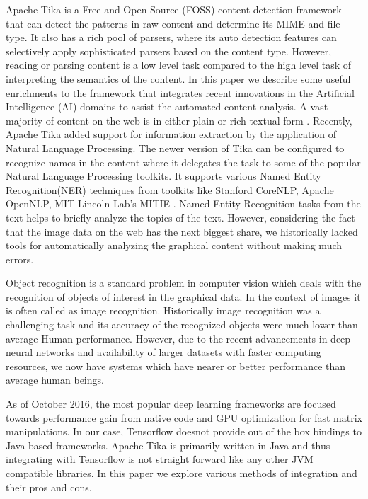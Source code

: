 \documentclass[letterpaper, 10 pt, conference]{ieeeconf}  %
\begin{document}
Apache Tika\cite{mattmann2011tika} is a Free and Open Source (FOSS) content detection framework that can detect the patterns in raw content and determine its MIME and file type. It also has a rich pool of parsers, where its auto detection features can selectively apply sophisticated parsers based on the content type. However, reading or parsing content is a low level task compared to the high level task of interpreting the semantics of the content. In this paper we describe some useful enrichments to the framework that integrates recent innovations in the Artificial Intelligence (AI) domains to assist the automated content analysis. A vast majority of content on the web is in either plain or rich textual form \cite{}. Recently, Apache Tika added support for information extraction by the application of Natural Language Processing\cite{}. The newer version of Tika can be configured to recognize names in the content where it delegates the task to some of the popular Natural Language Processing toolkits. It supports various Named Entity Recognition(NER) techniques from toolkits like Stanford CoreNLP\cite{}, Apache OpenNLP\cite{}, MIT Lincoln Lab's MITIE \cite{}. Named Entity Recognition tasks from the text helps to briefly analyze the topics of the text. However, considering the fact that the image data on the web has the next biggest share, we historically lacked tools for automatically analyzing the graphical content without making much errors. 

Object recognition is a standard problem in computer vision which deals with the recognition of objects of interest in the graphical data. In the context of images it is often called as image recognition. Historically image recognition was a challenging task and its accuracy of the recognized objects were much lower than average Human performance. However, due to the recent advancements in deep neural networks and availability of larger datasets with faster computing resources, we now have systems which have nearer or better performance than average human beings.



As of October 2016, the most popular deep learning frameworks are focused towards performance gain from native code and GPU optimization for fast matrix manipulations\cite{}. In our case, Tensorflow doesnot provide out of the box bindings to Java based frameworks. Apache Tika is primarily written in Java and thus integrating with Tensorflow is not straight forward like any other JVM compatible libraries. In this paper we explore various methods of integration and their pros and cons. 
\end{document}
